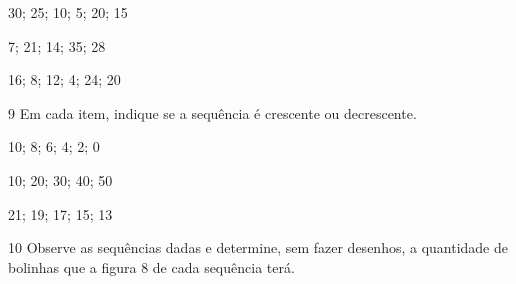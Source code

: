 \begin{escolha}
\item 30; 25; 10; 5; 20; 15\\

\item 7; 21; 14; 35; 28\\

\item 16; 8; 12; 4; 24; 20\\
\end{escolha}

\num{9} Em cada item, indique se a sequência é crescente ou decrescente.

\begin{escolha}
\item 10; 8; 6; 4; 2; 0\\

\item 10; 20; 30; 40; 50\\

\item 21; 19; 17; 15; 13\\

\end{escolha}

\num{10} Observe as sequências dadas e determine, sem fazer desenhos, a
quantidade de bolinhas que a figura 8 de cada sequência terá.

